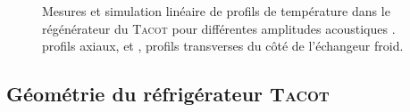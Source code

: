 \begin{figure}[!ht]
    \centering
	\begin{subfigure}{.47\textwidth}
		\centering
		\caption{}
		\label{fig:ATE_ProfilsAX_5mm}
	\end{subfigure}		
	\begin{subfigure}{.47\textwidth}
		\centering
		\caption{}
		\label{fig:ATE_ProfilsCHX_5mm}
	\end{subfigure}	    
    \caption{Mesures et simulation linéaire de profils de température dans le régénérateur du \textsc{Tacot} pour différentes amplitudes acoustiques \cite{ramadan_design_2021}.  profils axiaux, et , profils transverses du côté de l'échangeur froid.}
    \label{fig:ATE_Profils_5mm}
\end{figure}

\subsection{Géométrie du réfrigérateur \textsc{Tacot}}
